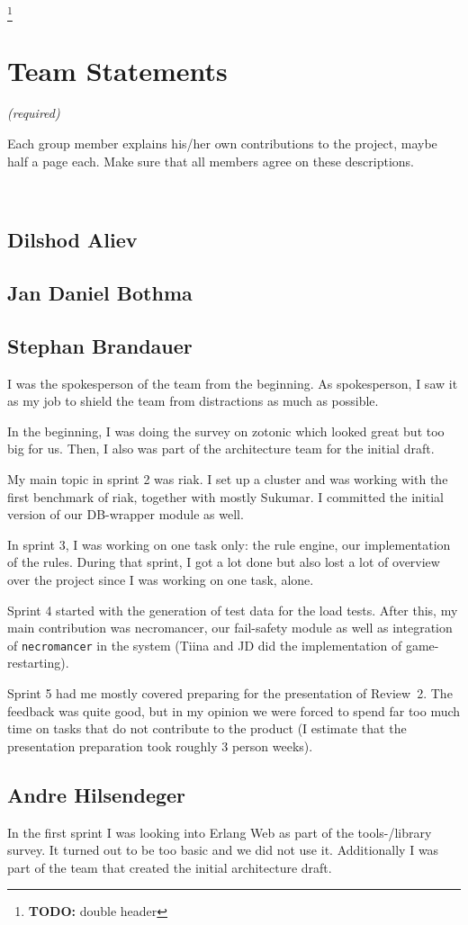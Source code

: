 \documentclass[11pt,a4paper]{report}
\newcommand{\hi}[1]{{\color{red}\tiny \em #1\/}\\}
\newcommand{\todo}[1]{\footnote{{\color{red} {\bf TODO:} #1}}}
\begin{document}
\appendix
\todo{double header}

\chapter{Team Statements}
\hi{ (required)

Each group member explains his/her own contributions to the project, maybe half a page each. Make sure that all members agree on these descriptions.}
\section{Dilshod Aliev}
\section{Jan Daniel Bothma}
\section{Stephan Brandauer}
I was the spokesperson of the team from the beginning. As spokesperson,
I saw it as my job to shield the team from distractions as much as possible.

In the beginning, I was doing the survey on zotonic which looked great but too
big for us. Then, I also was part of the architecture team for the initial
draft.

My main topic in sprint 2 was riak. I set up a cluster and was working with the
first benchmark of riak, together with mostly Sukumar.
I committed the initial version of our DB-wrapper module as well.

In sprint 3, I was working on one task only: the rule engine, our implementation
of the rules. During that sprint, I got a lot done but also lost a lot of
overview over the project since I was working on one task, alone.

Sprint 4 started with the generation of test data for the load tests. After
this, my main contribution was necromancer, our fail-safety module as well as
integration of {\tt necromancer} in the system (Tiina and JD did the
implementation of game-restarting).

Sprint 5 had me mostly covered preparing for the presentation of Review~2.
The feedback was quite good, but in my opinion we were forced to spend far too
much time on tasks that do not contribute to the product (I estimate that the
presentation preparation took roughly 3 person weeks).

\section{Andre Hilsendeger}
In the first sprint I was looking into Erlang Web as part of the tools-/library survey.
It turned out to be too basic and we did not use it.
Additionally I was part of the team that created the initial architecture draft.
\end{document}
